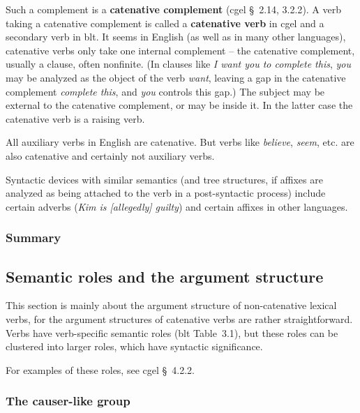 \documentclass{article}
\newcommand*{\citesec}[1]{\S~{#1}}
\newcommand*{\citetable}[1]{Table~{#1}}
\newcommand*{\concept}[1]{\textbf{#1}}
\newcommand*{\corpus}[1]{\emph{#1}}
\begin{document}
Such a complement is a \concept{catenative complement} (\ac{cgel} \citesec{2.14, 3.2.2}).
A verb taking a catenative complement is called a \concept{catenative verb} in \ac{cgel} 
and a secondary verb in \ac{blt}.  
It seems in English (as well as in many other languages),
catenative verbs only take one internal complement 
-- the catenative complement, usually a clause, often nonfinite.
(In clauses like \corpus{I want you to complete this},
\corpus{you} may be analyzed as the object of the verb \corpus{want}, 
leaving a gap in the catenative complement \corpus{complete this},
and \corpus{you} controls this gap.)
The subject may be external to the catenative complement,
or may be inside it.
In the latter case the catenative verb is a raising verb. %

All auxiliary verbs in English are catenative. 
But verbs like \corpus{believe}, \corpus{seem}, etc. are also catenative and certainly not auxiliary verbs.

Syntactic devices with similar semantics 
(and tree structures, if affixes are analyzed as being attached to the verb in a post-syntactic process)
include certain adverbs (\corpus{Kim is [allegedly] guilty})
and certain affixes in other languages.

\subsubsection{Summary}


\subsection{Semantic roles and the argument structure}

This section is mainly about the argument structure of non-catenative lexical verbs,
for the argument structures of catenative verbs are rather straightforward.
Verbs have verb-specific semantic roles (\ac{blt} \citetable{3.1}),
but these roles can be clustered into larger roles,
which have syntactic significance. %

For examples of these roles, see \ac{cgel} \citesec{4.2.2}.



\subsubsection{The causer-like group}
\end{document}

